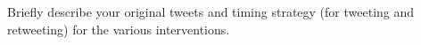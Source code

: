 Briefly describe your original tweets and timing strategy (for tweeting and retweeting) for the various interventions.\\